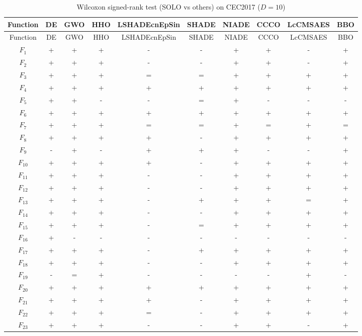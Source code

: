 \begin{center}
\small
\renewcommand{\arraystretch}{1.25}
\begin{longtable}{cccccccccc}
\caption{Wilcoxon signed-rank test (SOLO vs others) on CEC2017 ($D=10$) }
\label{tab:wilcoxon_CEC2017_10} \\
\toprule
Function & DE & GWO & HHO & LSHADEcnEpSin & SHADE & NIADE & CCCO & LcCMSAES & BBO \\
\midrule
\endfirsthead
\toprule
Function & DE & GWO & HHO & LSHADEcnEpSin & SHADE & NIADE & CCCO & LcCMSAES & BBO \\
\midrule
\endhead
$F_{1}$ & + & + & + & - & - & + & + & - & + \\
$F_{2}$ & + & + & + & - & - & + & + & - & + \\
$F_{3}$ & + & + & + & = & = & + & + & + & + \\
$F_{4}$ & + & + & + & + & + & + & + & + & + \\
$F_{5}$ & + & + & - & - & = & + & - & - & - \\
$F_{6}$ & + & + & + & + & + & + & + & + & + \\
$F_{7}$ & + & + & + & = & = & + & = & + & = \\
$F_{8}$ & + & + & + & + & - & + & + & + & + \\
$F_{9}$ & - & + & - & + & + & + & - & - & + \\
$F_{10}$ & + & + & + & + & - & + & + & + & + \\
$F_{11}$ & + & + & + & - & - & + & + & + & + \\
$F_{12}$ & + & + & + & - & - & + & + & + & + \\
$F_{13}$ & + & + & + & - & + & + & + & = & + \\
$F_{14}$ & + & + & + & - & - & + & + & + & + \\
$F_{15}$ & + & + & + & - & = & + & + & + & + \\
$F_{16}$ & + & - & - & - & - & - & - & - & - \\
$F_{17}$ & + & + & + & - & + & + & + & + & + \\
$F_{18}$ & + & + & + & - & - & + & + & + & + \\
$F_{19}$ & - & = & + & - & - & - & - & + & - \\
$F_{20}$ & + & + & + & + & + & + & + & + & + \\
$F_{21}$ & + & + & + & + & - & + & + & + & + \\
$F_{22}$ & + & + & + & = & - & + & + & + & + \\
$F_{23}$ & + & + & + & - & - & + & + & - & + \\

\end{longtable}
\end{center}
